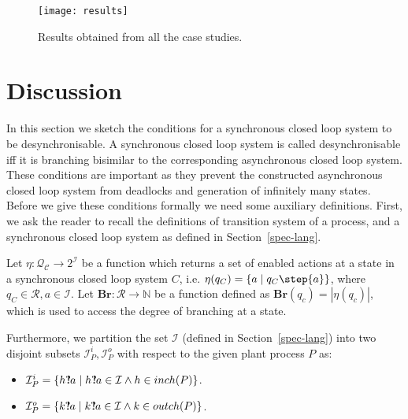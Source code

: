 \documentclass[a4paper,english,final]{article}
\theoremstyle{plain}
\theoremstyle{definition}
\newcommand{\com}{\ensuremath{?\mkern-6mu!}}
\newcommand{\hide}{\ensuremath{\mathcal{I}}}
\newcommand{\br}{\ensuremath{\mathbf{Br}}}
\begin{document}
\begin{figure}\centering
\texttt{[image: results]}
\caption{Results obtained from all the case studies.}\label{results}
\end{figure}

\section{Discussion}\label{sec-disc}
In this section we sketch the conditions for a synchronous closed loop system to be desynchronisable. A synchronous closed loop system is called desynchronisable iff it is branching bisimilar to the corresponding asynchronous closed loop system. These conditions are important as they prevent the constructed asynchronous closed loop system from deadlocks and generation of infinitely many states. Before we give these conditions formally we need some auxiliary definitions. First, we ask the reader to recall the definitions of transition system of a process, and a synchronous closed loop system as defined in Section~\ref{spec-lang}.

Let $\eta:\mathcal{Q_{C}}\rightarrow 2^\hide$ be a function which returns a set of enabled actions at a state in a synchronous closed loop system $C$, i.e. $\eta(q_C)=\{a\mid q_C\step{a}\}$, where $q_C\in\mathcal{R},a\in\hide$. Let $\br:\mathcal{R}\rightarrow\mathbb{N}$ be a function defined as $\br(q_c)=|\eta(q_c)|$, which is used to access the degree of branching at a state.

Furthermore, we partition the set $\hide$ (defined in Section~\ref{spec-lang}) into two disjoint subsets $\hide_{P}^i,\hide_{P}^o$ with respect to the given plant process $P$ as:
\begin{itemize}
\item $\hide_{P}^i=\{h\com a\mid h\com a\in \hide\wedge h\in inch(P)\}$.
\item $\hide_{P}^o=\{k\com a\mid k\com a\in \hide\wedge k\in outch(P)\}$.
\end{itemize}
\end{document}
